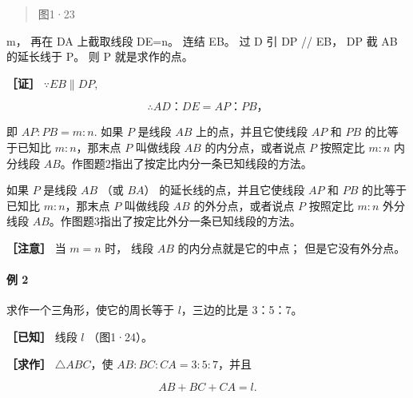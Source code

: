 \begin{quote}
图1·23
\end{quote}

m， 再在 DA 上截取线段 DE=n。 连结 EB。 过 D 引 DP // EB， DP 截 AB
的延长线于 P。 则 P 就是求作的点。

\textbf{［证］} \(\because EB \parallel DP,\)

\[
\therefore A D\text{：} D E = A P\text{：} P B\text{，}
\]

即 \(AP:PB = m:n.\) 如果 \(P\) 是线段 \(AB\) 上的点，并且它使线段 \(AP\)
和 \(PB\) 的比等于已知比 \(m:n\)，那末点 \(P\) 叫做线段 \(AB\)
的内分点，或者说点 \(P\) 按照定比 \(m:n\) 内分线段
\(AB\)。作图题2指出了按定比内分一条已知线段的方法。

如果 \(P\) 是线段 \(AB\) （或 \(BA\)） 的延长线的点，并且它使线段 \(AP\)
和 \(PB\) 的比等于已知比 \(m:n\)，那末点 \(P\) 叫做线段 \(AB\)
的外分点，或者说点 \(P\) 按照定比 \(m:n\) 外分线段
\(AB\)。作图题3指出了按定比外分一条已知线段的方法。

\textbf{［注意］} 当 \(m = n\) 时， 线段 \(AB\) 的内分点就是它的中点；
但是它没有外分点。

\paragraph{例 2}

求作一个三角形，使它的周长等于 \(l\)，三边的比是 3：5：7。

\textbf{［已知］} 线段 \(l\) （图1·24）。

\textbf{［求作］} \(\triangle ABC\)，使 \(AB:BC:CA = 3:5:7\)，并且

\[
A B + B C + C A = l.
\]

